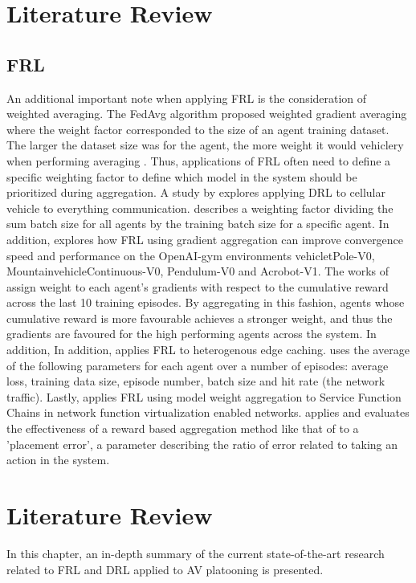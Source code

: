 \chapter{Literature Review}
\section{FRL}
An additional important note when applying FRL is the consideration of weighted averaging.
The FedAvg \cite{BrendanMcMahan2017a} algorithm proposed weighted gradient averaging where the weight factor corresponded to the size of an agent training dataset.  The larger the dataset size was for the agent, the more weight it would vehiclery when performing averaging \cite{BrendanMcMahan2017a}.  Thus, applications of FRL often need to define a specific weighting factor to define which model in the system should be prioritized during aggregation.  A study by \cite{ZhangX2020} explores applying DRL to cellular vehicle to everything communication. \cite{ZhangX2020} describes a weighting factor dividing the sum batch size for all agents  by the training batch size for a specific agent.  In addition, \cite{LimHyun2021} explores how FRL using gradient aggregation can improve convergence speed and performance on the OpenAI-gym environments vehicletPole-V0, MountainvehicleContinuous-V0, Pendulum-V0 and Acrobot-V1. The works of \cite{LimHyun2021} assign weight to each agent's gradients with respect to the cumulative reward across the last 10 training episodes. By aggregating in this fashion, agents whose cumulative reward is more favourable achieves a stronger weight, and thus the gradients are favoured for the high performing agents across the system.  In addition, In addition, \cite{WangXiaofei2021} applies FRL to heterogenous edge caching.  \cite{WangXiaofei2021} uses the average of the following parameters for each agent over a number of episodes: average loss, training data size, episode number, batch size and hit rate (the network traffic). Lastly, \cite{Huang2021} applies FRL using model weight aggregation to Service Function Chains in network function virtualization enabled networks.  \cite{Huang2021} applies and evaluates the effectiveness of a reward based aggregation method like that of \cite{WangXiaofei2021} to a 'placement error', a parameter describing the ratio of error related to taking an action in the system.

\chapter{Literature Review} \label{chap:litreview}
In this chapter, an in-depth summary of the current state-of-the-art research related to FRL and DRL applied to AV platooning is presented.


